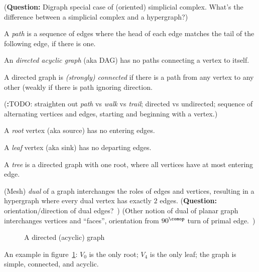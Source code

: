 \documentclass[11pt,openany]{book}
\begin{document}
(\textbf{Question:} 
Digraph special case of (oriented) simplicial complex.
What's the difference between a simplicial complex 
and a hypergraph?)

A \textit{path} is a sequence of edges where the head of each
edge matches the tail of the following edge, if there is one.

An \textit{directed acyclic graph} (aka DAG) has no paths
connecting a vertex to itself.

A directed graph is \textit{(strongly) connected} if there is a path
from any vertex to any other (weakly if there is path
ignoring direction.

(\textbf:{TODO:} straighten out \textit{path} vs \textit{walk} vs
\textit{trail}; directed vs undirected; sequence of alternating
vertices and edges, starting and beginning with a vertex.)

A \textit{root} vertex (aka source) has no entering edges.

A \textit{leaf} vertex (aka sink) has no departing edges.

A \textit{tree} is a directed graph with one root, 
where all vertices have at most entering edge.

(Mesh) \textit{dual} of a graph interchanges the roles of edges 
and vertices, resulting in a hypergraph where every dual vertex
has exactly $2$ edges. 
(\textbf{Question:} orientation/direction of dual edges?~\cite{rusnak2012oriented})
(Other notion of dual of planar graph interchanges vertices and ``faces'',
orientation from $90^{\comop}$ turn of primal edge.~\cite{wiki_2020_dual_graph})

\begin{figure}
\centering
{}
\caption{A directed (acyclic) graph}
\label{fig:a_digraph}
\end{figure}

An example in figure~\ref{fig:a_digraph}:
$V_0$ is the only root; $V_4$ is the only leaf;
the graph is simple, connected, and acyclic.
\end{document}
